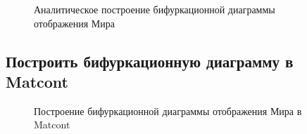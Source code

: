 \documentclass[12pt, a4paper]{article}
\begin{document}
\begin{figure}[H]
	\caption{Аналитическое построение бифуркационной диаграммы отображения Мира}
\end{figure}

\subsection{Построить бифуркационную диаграмму в Matcont}
\begin{figure}[H]
	\caption{Построение бифуркационной диаграммы отображения Мира в Matcont}
\end{figure}
\end{document}
